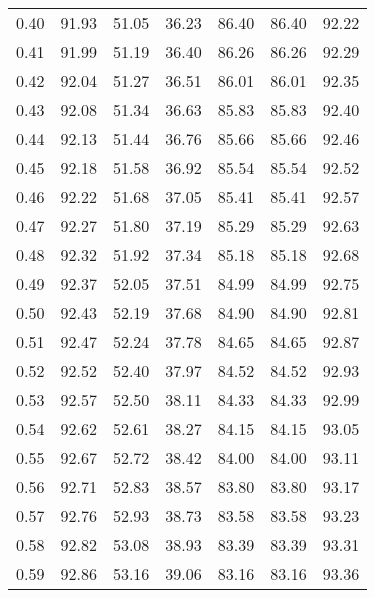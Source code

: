 \begin{tabular}{|c|c|c|c|c|c|c|}
      0.40 &     91.93 &     51.05 &      36.23 &   86.40 &      86.40 &         92.22 \\
      0.41 &     91.99 &     51.19 &      36.40 &   86.26 &      86.26 &         92.29 \\
      0.42 &     92.04 &     51.27 &      36.51 &   86.01 &      86.01 &         92.35 \\
      0.43 &     92.08 &     51.34 &      36.63 &   85.83 &      85.83 &         92.40 \\
      0.44 &     92.13 &     51.44 &      36.76 &   85.66 &      85.66 &         92.46 \\
      0.45 &     92.18 &     51.58 &      36.92 &   85.54 &      85.54 &         92.52 \\
      0.46 &     92.22 &     51.68 &      37.05 &   85.41 &      85.41 &         92.57 \\
      0.47 &     92.27 &     51.80 &      37.19 &   85.29 &      85.29 &         92.63 \\
      0.48 &     92.32 &     51.92 &      37.34 &   85.18 &      85.18 &         92.68 \\
      0.49 &     92.37 &     52.05 &      37.51 &   84.99 &      84.99 &         92.75 \\
      0.50 &     92.43 &     52.19 &      37.68 &   84.90 &      84.90 &         92.81 \\
      0.51 &     92.47 &     52.24 &      37.78 &   84.65 &      84.65 &         92.87 \\
      0.52 &     92.52 &     52.40 &      37.97 &   84.52 &      84.52 &         92.93 \\
      0.53 &     92.57 &     52.50 &      38.11 &   84.33 &      84.33 &         92.99 \\
      0.54 &     92.62 &     52.61 &      38.27 &   84.15 &      84.15 &         93.05 \\
      0.55 &     92.67 &     52.72 &      38.42 &   84.00 &      84.00 &         93.11 \\
      0.56 &     92.71 &     52.83 &      38.57 &   83.80 &      83.80 &         93.17 \\
      0.57 &     92.76 &     52.93 &      38.73 &   83.58 &      83.58 &         93.23 \\
      0.58 &     92.82 &     53.08 &      38.93 &   83.39 &      83.39 &         93.31 \\
      0.59 &     92.86 &     53.16 &      39.06 &   83.16 &      83.16 &         93.36 \\

\end{tabular}
